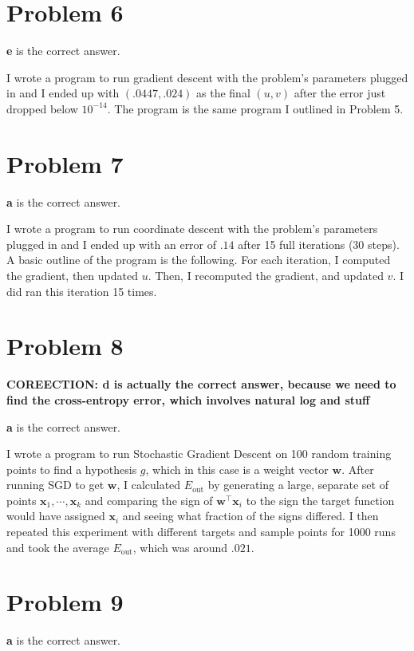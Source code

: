 \documentclass{article}
\begin{document}
\section*{Problem 6}
\textbf{e} is the correct answer.

\noindent I wrote a program to run gradient descent with the problem's
parameters plugged in and I ended up with $(.0447, .024)$ as the final
$(u,v)$ after the error just dropped below $10^{-14}$. The program is the
same program I outlined in Problem 5.

\section*{Problem 7}
\textbf{a} is the correct answer.

\noindent I wrote a program to run coordinate descent with the problem's
parameters plugged in and I ended up with an error of $.14$ after 15 full
iterations (30 steps). A basic outline of the program is the following. For
each iteration, I computed the gradient, then updated $u$. Then, I recomputed
the gradient, and updated $v$. I did ran this iteration 15 times.

\section*{Problem 8}
\textbf{COREECTION: d is actually the correct answer, because we need to
    find the cross-entropy error, which involves natural log and stuff}

\noindent \textbf{a} is the correct answer.

\noindent I wrote a program to run Stochastic Gradient Descent on 100 random
training points to find a hypothesis $g$, which in this case is a weight
vector $\mathbf{w}$. After running SGD to get $\mathbf{w}$, I calculated
$E_{\text{out}}$ by generating a large, separate set of points
$\mathbf{x}_1, \cdots, \mathbf{x}_k$ and comparing
the sign of $\mathbf{w}^{\intercal}\mathbf{x}_i$ to the sign the target function
would have assigned $\mathbf{x}_i$ and seeing what fraction of the signs differed.
I then repeated this experiment with different targets and sample points
for 1000 runs and took the average $E_{\text{out}}$, which was around $.021$.

\section*{Problem 9}
\textbf{a} is the correct answer.
\end{document}

